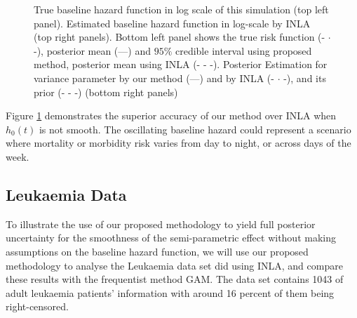 \documentclass[]{article}
\begin{document}
\begin{figure}[ht]
{}
\caption{True baseline hazard function in log scale of this simulation (top left panel). Estimated baseline hazard function in log-scale by INLA (top right panels). Bottom left panel shows the true risk function (- $\cdot$ -), posterior mean (---) and $95\%$ credible interval using proposed method, posterior mean using INLA (- - -). Posterior Estimation for variance parameter by our method (---) and by INLA (- $\cdot$ -), and its prior (- - -)  (bottom right panels)}
\label{fig:simulation}
\end{figure}

Figure \ref{fig:simulation} demonstrates the superior accuracy of our method over INLA when $h_{0}(t)$ is not smooth. The oscillating baseline hazard could represent a scenario where mortality or morbidity risk varies from day to night, or across days of the week. 

\subsection{Leukaemia Data}

To illustrate the use of our proposed methodology to yield full posterior uncertainty for the smoothness of the semi-parametric effect without making assumptions on the baseline hazard function, we will use our proposed methodology to analyse the Leukaemia data set \citet{inlacoxph} did using INLA, and compare these results with the frequentist method GAM. The data set contains 1043 of adult leukaemia patients' information with around 16 percent of them being right-censored. 
\end{document}
